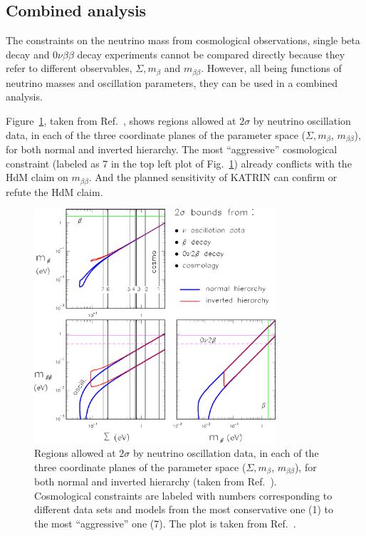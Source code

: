 \subsection{Combined analysis}
\label{sec:joian}
The constraints on the neutrino mass from cosmological observations, single beta decay and $0\nu\beta\beta$ decay experiments cannot be compared directly because they refer to different observables, $\Sigma, m_{\beta}$ and $m_{\beta\beta}$. However, all being functions of neutrino masses and oscillation parameters, they can be used in a combined analysis. 

Figure~\ref{fig:sum1b2b}, taken from Ref.~\cite{Fog07}, shows regions allowed at $2\sigma$ by neutrino oscillation data, in each of the three coordinate planes of the parameter space ($\Sigma, m_{\beta}$, $m_{\beta\beta}$), for both normal and inverted hierarchy. The most ``aggressive'' cosmological constraint (labeled as 7 in the top left plot of Fig.~\ref{fig:sum1b2b}) already conflicts with the HdM claim on $m_{\beta\beta}$. And the planned sensitivity of KATRIN can confirm or refute the HdM claim.
\begin{figure}[tbhp]
  \centering
  \includegraphics[width=0.8\textwidth]{sum1b2b.eps}  
  \caption{Regions allowed at $2\sigma$ by neutrino oscillation data,     in each of the three coordinate planes of the parameter space     ($\Sigma, m_{\beta}$, $m_{\beta\beta}$), for both normal and     inverted hierarchy (taken from Ref.~\cite{Fog07}). Cosmological     constraints are labeled with numbers corresponding to different     data sets and models from the most conservative one (1) to the     most ``aggressive'' one (7). The plot is taken from     Ref.~\cite{Fog07}.}
  \label{fig:sum1b2b}
\end{figure}

